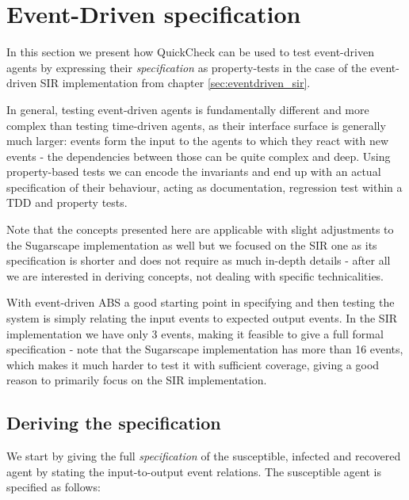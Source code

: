 \section{Event-Driven specification}
In this section we present how QuickCheck can be used to test event-driven agents by expressing their \textit{specification} as property-tests in the case of the event-driven SIR implementation from chapter \ref{sec:eventdriven_sir}.

In general, testing event-driven agents is fundamentally different and more complex than testing time-driven agents, as their interface surface is generally much larger: events form the input to the agents to which they react with new events - the dependencies between those can be quite complex and deep. Using property-based tests we can encode the invariants and end up with an actual specification of their behaviour, acting as documentation, regression test within a TDD and property tests.

Note that the concepts presented here are applicable with slight adjustments to the Sugarscape implementation as well but we focused on the SIR one as its specification is shorter and does not require as much in-depth details - after all we are interested in deriving concepts, not dealing with specific technicalities.

With event-driven ABS a good starting point in specifying and then testing the system is simply relating the input events to expected output events. In the SIR implementation we have only 3 events, making it feasible to give a full formal specification - note that the Sugarscape implementation has more than 16 events, which makes it much harder to test it with sufficient coverage, giving a good reason to primarily focus on the SIR implementation. 

\subsection{Deriving the specification}
We start by giving the full \textit{specification} of the susceptible, infected and recovered agent by stating the input-to-output event relations. The susceptible agent is specified as follows:

